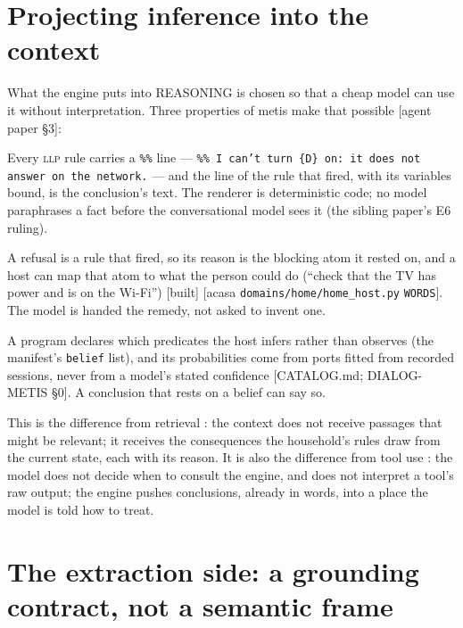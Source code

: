 \documentclass[11pt]{article}
\newcommand{\llp}{\textsc{llp}}
\newcommand{\src}[1]{{\footnotesize\textsf{[#1]}}}
\newcommand{\built}{\textsf{\small[built]}}
\begin{document}
\section{Projecting inference into the context}\label{sec:projection}

What the engine puts into REASONING is chosen so that a cheap model can use it without
interpretation. Three properties of metis make that possible \src{agent paper \S3}:

\begin{description}[nosep,leftmargin=1.2em]
\item[Narration lines are the rules' own words.] Every \llp{} rule carries a \texttt{\%\%}
line --- \texttt{\%\% I can't turn \{D\} on: it does not answer on the network.} --- and the
line of the rule that fired, with its variables bound, is the conclusion's text. The
renderer is deterministic code; no model paraphrases a fact before the conversational model
sees it (the sibling paper's E6 ruling).
\item[Refusals name their blocker.] A refusal is a rule that fired, so its reason is the
blocking atom it rested on, and a host can map that atom to what the person could do
(``check that the TV has power and is on the Wi-Fi'') \built{} \src{acasa
\texttt{domains/home/home\_host.py} \texttt{WORDS}}. The model is handed the remedy, not
asked to invent one.
\item[Beliefs are not observations.] A program declares which predicates the host infers
rather than observes (the manifest's \texttt{belief} list), and its probabilities come from
ports fitted from recorded sessions, never from a model's stated confidence
\src{CATALOG.md; DIALOG-METIS \S0}. A conclusion that rests on a belief can say so.
\end{description}

\noindent This is the difference from retrieval \cite{lewis2020rag}: the context does not
receive passages that might be relevant; it receives the consequences the household's rules
draw from the current state, each with its reason. It is also the difference from tool use
\cite{yao2023react,schick2023toolformer}: the model does not decide when to consult the
engine, and does not interpret a tool's raw output; the engine pushes conclusions, already in
words, into a place the model is told how to treat.

\section{The extraction side: a grounding contract, not a semantic frame}\label{sec:extraction}
\end{document}
